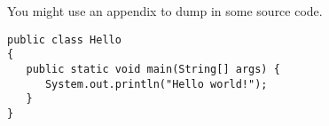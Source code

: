%
%

You might use an appendix to dump in some source code.

\begin{singlespace}
\begin{verbatim} 
public class Hello
{
   public static void main(String[] args) {
      System.out.println("Hello world!");
   }
}
\end{verbatim} 
\end{singlespace}